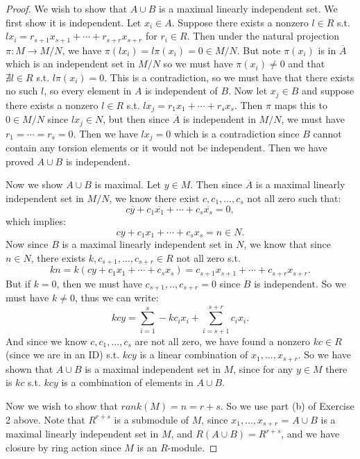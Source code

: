 \documentclass[9pt,reqno,twoside]{amsbook}
\theoremstyle{plain}
\numberwithin{section}{chapter}
\numberwithin{equation}{chapter}
\theoremstyle{definition}
\theoremstyle{remark}
\theoremstyle{plain}
\renewcommand{\bar}{\overline}%
\begin{document}
\begin{enumerate}[label=\arabic*.]
\begin{proof}
We wish to show that $A \cup B$ is a maximal linearly independent set. We first show it is independent. Let $x_i \in A$. Suppose there exists a nonzero $l \in R$ s.t. $lx_i = r_{s + 1}x_{s + 1} + \cdots + r_{s + r}x_{s + r}$ for $r_i \in R$. Then under the natural projection $\pi:M \to M/N$, we have $\pi(lx_i) = l\pi(x_i) = 0 \in M/N$. But note $\pi(x_i)$ is in $\bar{A	}$ which is an independent set in $M/N$ so we must have $\pi(x_i) \neq 0$ and that $\nexists l \in R$ s.t. $l\pi(x_i) = 0$. This is a contradiction, so we must have that there exists no such $l$, so every element in $A$ is independent of $B$. Now let $x_j \in B$ and suppose there exists a nonzero $l \in R$ s.t. $lx_j = r_1x_1 + \cdots + r_sx_s$. Then $\pi$ maps this to $0 \in M/N$ since $lx_j \in N$, but then since $\bar{A}$ is independent in $M/N$, we must have $r_1 = \cdots = r_s = 0$. Then we have $lx_j = 0$ which is a contradiction since $B$ cannot contain any torsion elements or it would not be independent. Then we have proved $A\cup B$ is independent. 



Now we show $A \cup B$ is maximal. Let $y \in M$. Then since $\bar{A}$ is a maximal linearly independent set in $M/N$, we know there exist $c,c_1,...,c_s$ not all zero such that:
$$
c\bar{y} + c_1\bar{x_1} + \cdots + c_s\bar{x_s} = 0,
$$
 which implies:
 $$
 cy + c_1x_1 + \cdots + c_sx_s = n \in N.
 $$
Now since $B$ is a maximal linearly independent set in $N$, we know that since $n \in N$, there exists $k,c_{s + 1},...,c_{s + r} \in R$ not all zero s.t. 
$$
kn = k(cy + c_1x_1 + \cdots + c_sx_s) = c_{s + 1}x_{s + 1} + \cdots + c_{s + r}x_{s + r}.
$$
But if $k = 0$, then we must have $c_{s + 1},..,c_{s + r} = 0$ since $B$ is independent. So we must have $k \neq 0$, thus we can write:
$$
kcy = \sum_{i = 1}^s-kc_ix_i + \sum_{i = s + 1}^{s + r}c_ix_i.
$$
And since we know $c,c_1,...,c_s$ are not all zero, we have found a nonzero $kc \in R$ (since we are in an ID) s.t. $kcy$ is a linear combination of $x_1,...,x_{s + r}$. So we have shown that $A \cup B$ is a maximal independent set in $M$, since for any $y \in M$ there is $kc$ s.t. $kcy$ is a combination of elements in $A \cup B$. 

Now we wish to show that $rank(M) = n = r + s$. So we use part (b) of Exercise 2 above. Note that $R^{r + s}$ is a submodule of $M$, since $x_1,...,x_{s + r}$ = $A \cup B$ is a maximal linearly independent set in $M$, and $R(A \cup B) = R^{r + s}$, and we have closure by ring action since $M$ is an $R$-module. 


\end{proof}
\end{enumerate}
\end{document}
